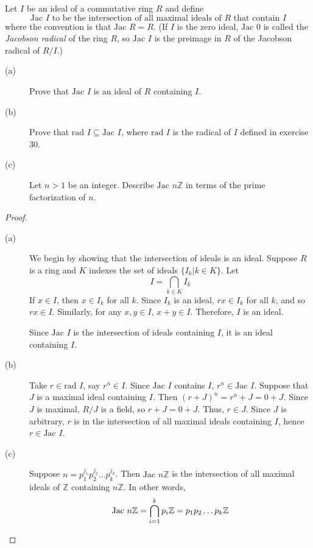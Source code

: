 \documentclass[12pt,leqno]{book}
\numberwithin{equation}{section}
\newcommand{\question}[2] {\vspace{.25in}\noindent\fbox{#1} #2 \vspace{.10in}}
\theoremstyle{definition}
\begin{document}
\question{32}{Let $I$ be an ideal of a commutative ring $R$ and define\[\text{Jac }I\text{ to be the intersection of all maximal ideals of }R\text{ that contain }I\]}where the convention is that $\text{Jac }R=R$. (If $I$ is the zero ideal, $\text{Jac }0$ is called the \textit{Jacobson radical} of the ring $R$, so $\text{Jac }I$ is the preimage in $R$ of the Jacobson radical of $R/I$.)
\begin{description}
 \item [(a)] Prove that $\text{Jac }I$ is an ideal of $R$ containing $I$.
 \item [(b)] Prove that $\text{rad } I\subseteq\text{Jac }I$, where $\text{rad } I$ is the radical of $I$ defined in exercise 30.
 \item [(c)] Let $n>1$ be an integer. Describe $\text{Jac }n\mathbb{Z}$ in terms of the prime factorization of $n$.
\end{description}

\begin{proof}\indent
\begin{description}
 \item [(a)] We begin by showing that the intersection of ideals is an ideal. Suppose $R$ is a ring and $K$ indexes the set of ideals $\{I_k|k\in K\}$. Let \[I=\bigcap_{k\in K}I_k\] If $x\in I$, then $x\in I_k$ for all $k$. Since $I_k$ is an ideal, $rx\in I_k$ for all $k$, and so $rx\in I$. Similarly, for any $x,y\in I$, $x+y\in I$. Therefore, $I$ is an ideal.

  Since $\text{Jac }I$ is the intersection of ideals containing $I$, it is an ideal containing $I$.
 \item [(b)] Take $r\in\text{rad }I$, say $r^n\in I$. Since $\text{Jac }I$ contains $I$, $r^n\in\text{Jac }I$. Suppose that $J$ is a maximal ideal containing $I$. Then $(r+J)^n=r^n+J=0+J$. Since $J$ is maximal, $R/J$ is a field, so $r+J=0+J$. Thus, $r\in J$. Since $J$ is arbitrary, $r$ is in the intersection of all maximal ideals containing $I$, hence $r\in\text{Jac }I$.
 \item [(c)] Suppose $n=p_1^{j_1}p_2^{j_2}\hdots p_k^{j_k}$. Then $\text{Jac }n\mathbb{Z}$ is the intersection of all maximal ideals of $\mathbb{Z}$ containing $n\mathbb{Z}$. In other words, \[\text{Jac }n\mathbb{Z}=\bigcap_{i=1}^kp_i\mathbb{Z}=p_1p_2\hdots p_k\mathbb{Z}\qedhere\]
\end{description}
\end{proof}
\end{document}
